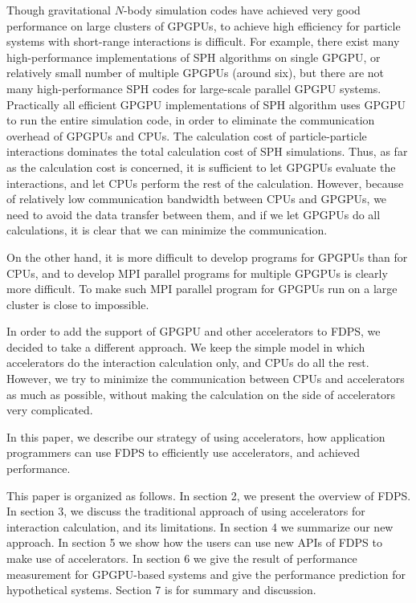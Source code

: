 \documentclass[dvipdfmx]{pasj01}
\begin{document}
Though gravitational $N$-body simulation codes have achieved very good
performance on large clusters of GPGPUs, to achieve high efficiency
for particle systems with short-range interactions is difficult. For
example, there exist many high-performance implementations of SPH
algorithms on single GPGPU, or relatively small number of multiple
GPGPUs (around six), but there are not many high-performance SPH codes
for large-scale parallel GPGPU systems. Practically all efficient
GPGPU implementations of SPH algorithm uses GPGPU to run the entire
simulation code, in order to eliminate the communication overhead of
GPGPUs and CPUs. The calculation cost of particle-particle
interactions dominates the total calculation cost of SPH
simulations. Thus, as far as the calculation cost is concerned, it is
sufficient to let GPGPUs evaluate the interactions, and let CPUs
perform the rest of the calculation. However, because of relatively
low communication bandwidth between CPUs and GPGPUs, we need to avoid
the data transfer between them, and if we let GPGPUs do all
calculations, it is clear that we can minimize the communication.

On the other hand, it is more difficult to develop programs for GPGPUs
than for CPUs, and to develop MPI parallel programs for multiple GPGPUs
is clearly more difficult. To make such MPI parallel program for
GPGPUs run on a large cluster is close to impossible.

In order to add the support of GPGPU and other accelerators to FDPS,
we decided to take a different approach. We keep the simple model in
which accelerators do the interaction calculation only, and CPUs do
all the rest. However, we try to minimize the communication between
CPUs and accelerators as much as possible, without making the
calculation on the side of accelerators very complicated.

In this paper, we describe our strategy of using accelerators, how
application programmers can use FDPS to efficiently use accelerators,
and achieved performance.

This paper is organized as follows. In section 2, we present the
overview of FDPS. In section 3, we discuss the traditional approach of
using accelerators for interaction calculation, and its
limitations. In section 4 we summarize our new approach. In section 5
we show how the users can use new APIs of FDPS to make use of
accelerators. In section 6 we give the result of performance
measurement for GPGPU-based systems and give the performance
prediction for hypothetical systems. Section 7 is for summary and
discussion.
\end{document}
